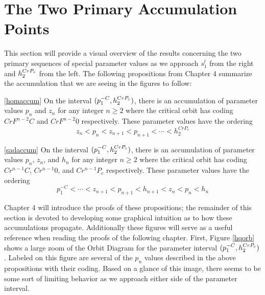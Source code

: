 \section{The Two Primary Accumulation Points}
This section will provide a visual overview of the results concerning the two primary sequences of special parameter values as we approach $s_1^l$ from the right and $h^{CrP_c}_2$ from the left. The following propositions from Chapter 4 summarize the accumulation that we are seeing in the figures to follow:

\begin{customthm}{\ref{homaccum}}
On the interval $ (p^{-C}_1, h^{CrP_c}_2)$, there is an accumulation of parameter values $p_n$ and $z_n$ for any integer $n \geq 2$ where the critical orbit has coding $CrF^{n-2}C$ and $CrF^{n-2}0$ respectively. These parameter values have the ordering
\[
z_n < p_n < z_{n+1} < p_{n+1} < \cdots < h_2^{CrP_c}
\]
\end{customthm}

\begin{customthm}{\ref{sadaccum}}
On the interval $ (p^{-C}_1, h^{CrP_c}_2)$, there is an accumulation of parameter values $p_n$, $z_n$, and $h_n$ for any integer $n \geq 2$ where the critical orbit has coding $Cr^{n-1}C$, $Cr^{n-1}0$, and $Cr^{n-1}P_c$ respectively. These parameter values have the ordering
\[
p_1^{-C} < \cdots < z_{n+1} < p_{n+1} < h_{n+1} < z_n < p_n < h_n
\]
\end{customthm}

Chapter 4 will introduce the proofs of these propositions; the remainder of this section is devoted to developing some graphical intuition as to how these accumulations propagate. Additionally these figures will serve as a useful reference when reading the proofs of the following chapter.  First, Figure \ref{hqorb} shows a large zoom of the Orbit Diagram for the parameter interval $ (p^{-C}_1, h^{CrP_c}_2)$. Labeled on this figure are several of the $p_n$ values described in the above propositions with their coding. Based on a glance of this image, there seems to be some sort of limiting behavior as we approach either side of the parameter interval.

